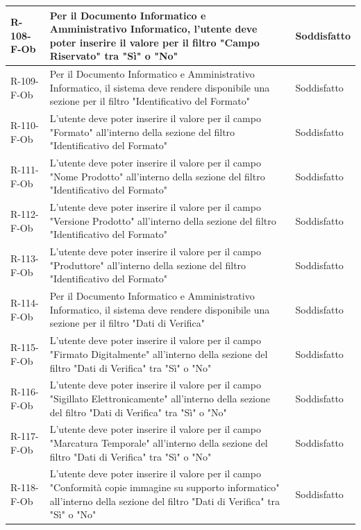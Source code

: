 \begin{longtable}{|p{2.5cm}|p{9.5cm}|p{2.5cm}|}
\hline
R-108-F-Ob & Per il Documento Informatico e Amministrativo Informatico, l'utente deve poter inserire il valore per il filtro "Campo Riservato" tra "Sì" o "No" & Soddisfatto \\
\hline
R-109-F-Ob & Per il Documento Informatico e Amministrativo Informatico, il sistema deve rendere disponibile una sezione per il filtro "Identificativo del Formato" & Soddisfatto \\
\hline
R-110-F-Ob & L'utente deve poter inserire il valore per il campo "Formato" all'interno della sezione del filtro "Identificativo del Formato" & Soddisfatto \\
\hline
R-111-F-Ob & L'utente deve poter inserire il valore per il campo "Nome Prodotto" all'interno della sezione del filtro "Identificativo del Formato" & Soddisfatto \\
\hline
R-112-F-Ob & L'utente deve poter inserire il valore per il campo "Versione Prodotto" all'interno della sezione del filtro "Identificativo del Formato" & Soddisfatto \\
\hline
R-113-F-Ob & L'utente deve poter inserire il valore per il campo "Produttore" all'interno della sezione del filtro "Identificativo del Formato" & Soddisfatto \\
\hline

R-114-F-Ob & Per il Documento Informatico e Amministrativo Informatico, il sistema deve rendere disponibile una sezione per il filtro "Dati di Verifica" & Soddisfatto \\
\hline
R-115-F-Ob & L'utente deve poter inserire il valore per il campo "Firmato Digitalmente" all'interno della sezione del filtro "Dati di Verifica" tra "Sì" o "No" & Soddisfatto \\
\hline
R-116-F-Ob & L'utente deve poter inserire il valore per il campo "Sigillato Elettronicamente" all'interno della sezione del filtro "Dati di Verifica" tra "Sì" o "No" & Soddisfatto \\
\hline
R-117-F-Ob & L'utente deve poter inserire il valore per il campo "Marcatura Temporale" all'interno della sezione del filtro "Dati di Verifica" tra "Sì" o "No" & Soddisfatto \\
\hline
R-118-F-Ob & L'utente deve poter inserire il valore per il campo "Conformità copie immagine su supporto informatico" all'interno della sezione del filtro "Dati di Verifica" tra "Sì" o "No" & Soddisfatto \\
\hline



\end{longtable}
